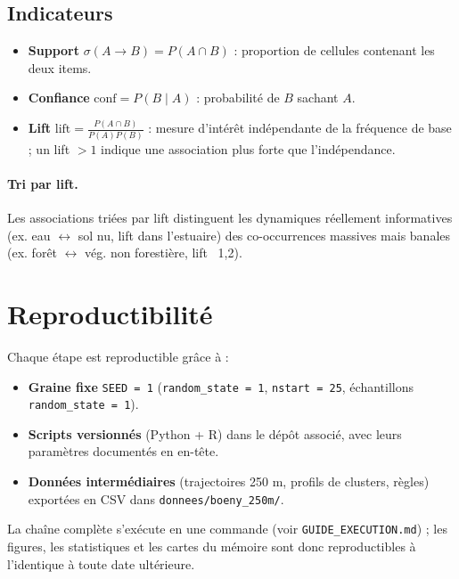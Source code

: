 \subsection{Indicateurs}

\begin{itemize}
  \item \textbf{Support} $\sigma(A \rightarrow B) = P(A \cap B)$ : proportion
        de cellules contenant les deux items.
  \item \textbf{Confiance} $\text{conf} = P(B \mid A)$ : probabilité de $B$
        sachant $A$.
  \item \textbf{Lift} $\text{lift} = \frac{P(A \cap B)}{P(A) P(B)}$ : mesure
        d'intérêt indépendante de la fréquence de base ; un lift $> 1$
        indique une association plus forte que l'indépendance.
\end{itemize}

\paragraph{Tri par lift.} Les associations triées par lift distinguent les
dynamiques réellement informatives (ex. eau $\leftrightarrow$ sol nu, lift
 dans l'estuaire) des co-occurrences massives mais banales
(ex. forêt $\leftrightarrow$ vég. non forestière, lift ~1,2).

\section{Reproductibilité}

Chaque étape est reproductible grâce à :
\begin{itemize}
  \item \textbf{Graine fixe} \texttt{SEED = 1} (\texttt{random\_state = 1},
        \texttt{nstart = 25}, échantillons \texttt{random\_state = 1}).
  \item \textbf{Scripts versionnés} (Python + R) dans le dépôt associé, avec
        leurs paramètres documentés en en-tête.
  \item \textbf{Données intermédiaires} (trajectoires 250 m, profils de
        clusters, règles) exportées en CSV dans \texttt{donnees/boeny_250m/}.
\end{itemize}

La chaîne complète s'exécute en une commande (voir \texttt{GUIDE_EXECUTION.md}) ;
les figures, les statistiques et les cartes du mémoire sont donc
reproductibles à l'identique à toute date ultérieure.
